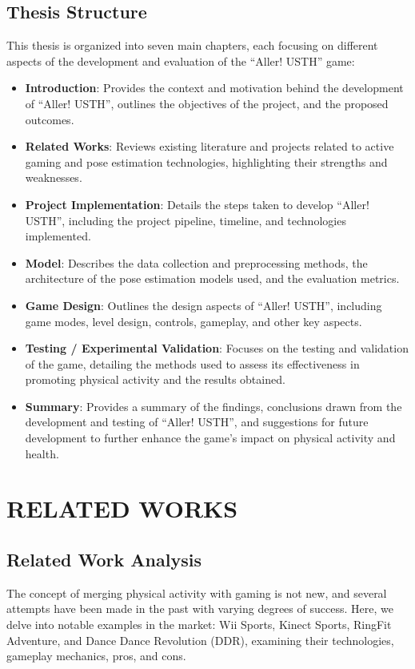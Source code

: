 \documentclass[12pt]{article}
\begin{document}
\subsection{Thesis Structure}
This thesis is organized into seven main chapters, each focusing on different aspects of the development and evaluation of the ``Aller! USTH'' game:

\begin{itemize}
    \item \textbf{Introduction}: Provides the context and motivation behind the development of ``Aller! USTH'', outlines the objectives of the project, and the proposed outcomes.
    \item \textbf{Related Works}: Reviews existing literature and projects related to active gaming and pose estimation technologies, highlighting their strengths and weaknesses.
    \item \textbf{Project Implementation}: Details the steps taken to develop ``Aller! USTH'', including the project pipeline, timeline, and technologies implemented.
    \item \textbf{Model}: Describes the data collection and preprocessing methods, the architecture of the pose estimation models used, and the evaluation metrics.
    \item \textbf{Game Design}: Outlines the design aspects of ``Aller! USTH'', including game modes, level design, controls, gameplay, and other key aspects.
    \item \textbf{Testing / Experimental Validation}: Focuses on the testing and validation of the game, detailing the methods used to assess its effectiveness in promoting physical activity and the results obtained.
    \item \textbf{Summary}: Provides a summary of the findings, conclusions drawn from the development and testing of ``Aller! USTH'', and suggestions for future development to further enhance the game’s impact on physical activity and health.
\end{itemize}

\clearpage


\section{RELATED WORKS}

\subsection{Related Work Analysis}
The concept of merging physical activity with gaming is not new, and several attempts have been made in the past with varying degrees of success. Here, we delve into notable examples in the market: Wii Sports, Kinect Sports, RingFit Adventure, and Dance Dance Revolution (DDR), examining their technologies, gameplay mechanics, pros, and cons.
\end{document}
